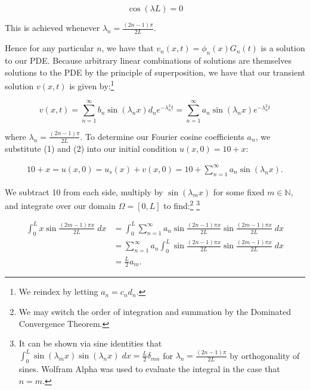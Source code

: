 \begin{solution}
    $$
    \cos{(\lambda L)} = 0
    $$

    This is achieved whenever $\lambda_n = \frac{(2 n - 1) \pi}{2L}$.

    Hence for any particular $n$, we have that $v_n(x, t) = \phi_n(x)G_n(t)$ is a solution to our PDE. Because arbitrary
    linear combinations of solutions are themselves solutions to the PDE by the principle of superposition, we have that
    our transient solution $v(x, t)$ is given by:\footnote{
        We reindex by letting $a_n = c_n d_n$.
    }

    \begin{equation}
    v(x, t) = \sum\limits_{n=1}^{\infty}{b_n \sin{(\lambda_n x)}} d_n e^{-\lambda_n^2 t}
            = \sum\limits_{n=1}^{\infty}{a_n \sin{(\lambda_n x)}} e^{-\lambda_n^2 t}
    \end{equation}

    where $\lambda_n = \frac{(2 n - 1) \pi}{2L}$. To determine our Fourier cosine coefficients $a_n$, we substitute (1)
    and (2) into our initial condition $u(x, 0) = 10 + x$:

    \begin{align*}
        10 + x = u(x, 0) = u_s(x) + v(x, 0) = 10 + \sum\limits_{n=1}^{\infty}{a_n \sin{(\lambda_n x)}}.
    \end{align*}

    We subtract 10 from each side, multiply by $\sin{(\lambda_m x)}$ for some fixed $m \in \mathbb{N}$, and 
    integrate over our domain $\Omega = [0, L]$ to find:\footnote{
        We may switch the order of integration and summation by the Dominated Convergence Theorem.
    } \footnote{
        It can be shown via sine identities that 
        $\int_0^L{\sin{(\lambda_m x)} \sin{(\lambda_n x)}}\; dx = \frac{L}{2} \delta_{mn}$ for 
        $\lambda_n = \frac{(2n - 1) \pi}{2L}$ by orthogonality of sines. Wolfram Alpha was used to evaluate the 
        integral in the case that $n = m$.
    }

    \begin{align*}
        \int_{0}^{L}{x \sin{\frac{(2 m - 1) \pi x}{2L}}\; dx}
            &= \int_{0}^{L}{\sum\limits_{n=1}^{\infty}{a_n \sin{\frac{(2 n - 1) \pi x}{2L}} \sin{\frac{(2 m - 1) \pi x}{2L}} }\; dx} \\
            &= \sum\limits_{n=1}^{\infty}{a_n \int_{0}^{L}{\sin{\frac{(2 n - 1) \pi x}{2L}} \sin{\frac{(2 m - 1) \pi x}{2L}} \; dx }} \\
            &= \frac{L}{2} a_m.
    \end{align*}


\end{solution}
